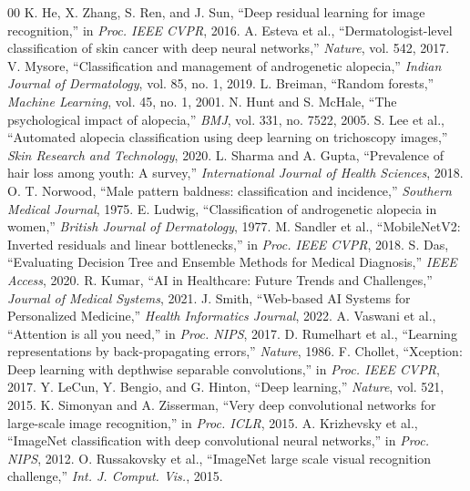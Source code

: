 \documentclass[conference]{IEEEtran}
\begin{document}
\begin{thebibliography}{00}
 K. He, X. Zhang, S. Ren, and J. Sun, ``Deep residual learning for image recognition,'' in \textit{Proc. IEEE CVPR}, 2016.
 A. Esteva et al., ``Dermatologist-level classification of skin cancer with deep neural networks,'' \textit{Nature}, vol. 542, 2017.
 V. Mysore, ``Classification and management of androgenetic alopecia,'' \textit{Indian Journal of Dermatology}, vol. 85, no. 1, 2019.
 L. Breiman, ``Random forests,'' \textit{Machine Learning}, vol. 45, no. 1, 2001.
 N. Hunt and S. McHale, ``The psychological impact of alopecia,'' \textit{BMJ}, vol. 331, no. 7522, 2005.
 S. Lee et al., ``Automated alopecia classification using deep learning on trichoscopy images,'' \textit{Skin Research and Technology}, 2020.
 L. Sharma and A. Gupta, ``Prevalence of hair loss among youth: A survey,'' \textit{International Journal of Health Sciences}, 2018.
 O. T. Norwood, ``Male pattern baldness: classification and incidence,'' \textit{Southern Medical Journal}, 1975.
 E. Ludwig, ``Classification of androgenetic alopecia in women,'' \textit{British Journal of Dermatology}, 1977.
 M. Sandler et al., ``MobileNetV2: Inverted residuals and linear bottlenecks,'' in \textit{Proc. IEEE CVPR}, 2018.
 S. Das, ``Evaluating Decision Tree and Ensemble Methods for Medical Diagnosis,'' \textit{IEEE Access}, 2020.
 R. Kumar, ``AI in Healthcare: Future Trends and Challenges,'' \textit{Journal of Medical Systems}, 2021.
 J. Smith, ``Web-based AI Systems for Personalized Medicine,'' \textit{Health Informatics Journal}, 2022.
 A. Vaswani et al., ``Attention is all you need,'' in \textit{Proc. NIPS}, 2017.
 D. Rumelhart et al., ``Learning representations by back-propagating errors,'' \textit{Nature}, 1986.
 F. Chollet, ``Xception: Deep learning with depthwise separable convolutions,'' in \textit{Proc. IEEE CVPR}, 2017.
 Y. LeCun, Y. Bengio, and G. Hinton, ``Deep learning,'' \textit{Nature}, vol. 521, 2015.
 K. Simonyan and A. Zisserman, ``Very deep convolutional networks for large-scale image recognition,'' in \textit{Proc. ICLR}, 2015.
 A. Krizhevsky et al., ``ImageNet classification with deep convolutional neural networks,'' in \textit{Proc. NIPS}, 2012.
 O. Russakovsky et al., ``ImageNet large scale visual recognition challenge,'' \textit{Int. J. Comput. Vis.}, 2015.
\end{thebibliography}
\end{document}
